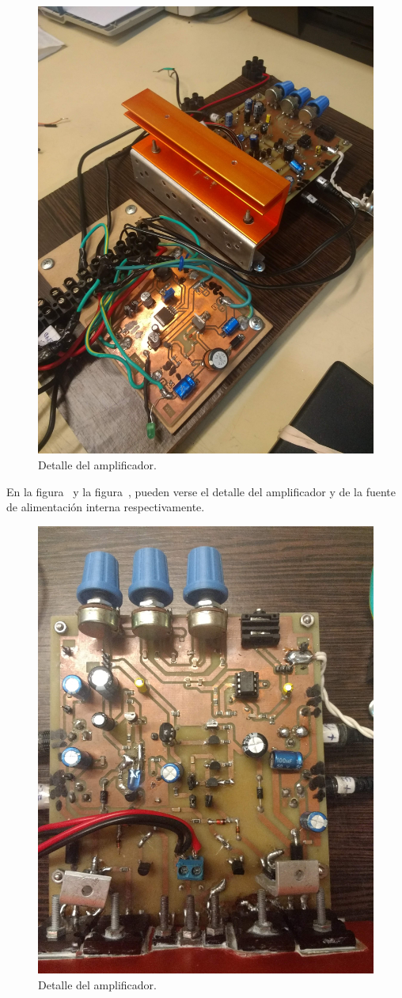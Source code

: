 \begin{figure}[H]
    \centering
    \includegraphics[height=0.95 \textwidth, angle=0]{img/fotos/2.jpg}
    \caption{Detalle del amplificador.}
    \label{fig:prototype2}
\end{figure}


\vfill

\clearpage


En la figura~ y la figura~, pueden verse el detalle del amplificador y de la fuente de alimentación interna respectivamente.


\begin{figure}[H]
    \centering
    \includegraphics[height=0.7 \textwidth, angle=90]{img/fotos/1.jpg}
    \caption{Detalle del amplificador.}
    \label{fig:prototype3}
\end{figure}

